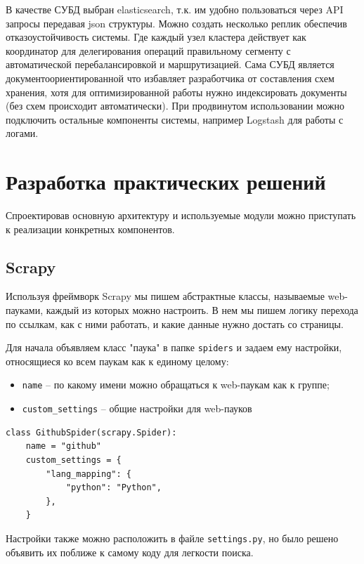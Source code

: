 В качестве СУБД выбран elasticsearch, т.к. им удобно пользоваться через API
запросы передавая json структуры. Можно создать несколько реплик обеспечив
отказоустойчивость системы. Где каждый узел кластера действует как координатор
для делегирования операций правильному сегменту с автоматической
перебалансировкой и маршрутизацией. Сама СУБД является документоориентированной
что избавляет разработчика от составления схем хранения, хотя для
оптимизированной работы нужно индексировать документы (без схем происходит
автоматически). При продвинутом использовании можно подключить остальные
компоненты системы, например Logstash для работы с логами.

\section{Разработка практических решений}
Спроектировав основную архитектуру и используемые модули можно приступать к
реализации конкретных компонентов.

\subsection{Scrapy}
Используя фреймворк Scrapy мы пишем абстрактные классы, называемые web-пауками,
каждый из которых можно настроить. В нем мы пишем логику перехода по ссылкам,
как с ними работать, и какие данные нужно достать со страницы.

Для начала объявляем класс "паука" в папке \verb|spiders| и задаем ему
настройки, относящиеся ко всем паукам как к единому целому:
\begin{itemize}
    \item \verb|name| -- по какому имени можно обращаться к web-паукам как к группе;
    \item \verb|custom_settings| -- общие настройки для web-пауков
\end{itemize}

\begin{verbatim}
class GithubSpider(scrapy.Spider):
    name = "github"
    custom_settings = {
        "lang_mapping": {
            "python": "Python",
        },
    }
\end{verbatim}

Настройки также можно расположить в файле \verb|settings.py|, но было решено
объявить их поближе к самому коду для легкости поиска.

